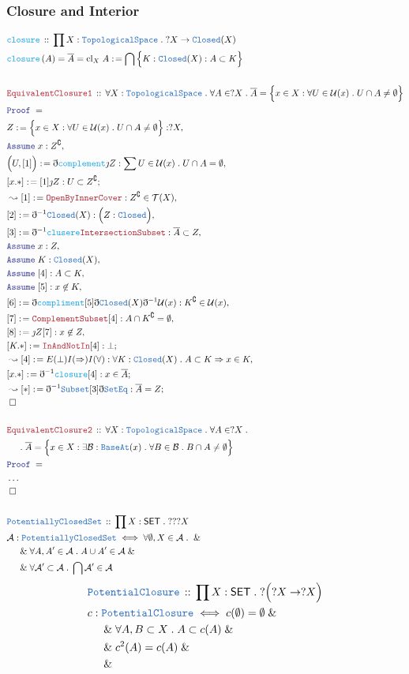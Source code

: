 \documentclass[12pt]{scrartcl}
\newcommand{\TYPE}[1]{\textcolor{NavyBlue}{\mathtt{#1}}}
\newcommand{\FUNC}[1]{\textcolor{Cerulean}{\mathtt{#1}}}
\newcommand{\LOGIC}[1]{\textcolor{Blue}{\mathtt{#1}}}
\newcommand{\THM}[1]{\textcolor{Maroon}{\mathtt{#1}}}
\renewcommand{\.}{\; . \;}
\newcommand{\de}{: \kern 0.1pc =}
\newcommand{\Act}[1]{\left( #1 \right)}
\newcommand{\Theorem}[2]{& \THM{#1} \, :: \, #2 \\ & \Proof = \\ }
\newcommand{\DeclareType}[2]{& \TYPE{#1} \, :: \, #2 \\}
\newcommand{\DefineType}[3]{& #1 : \TYPE{#2} \iff #3 \\}
\newcommand{\DeclareFunc}[2]{& \FUNC{#1} \, :: \, #2 \\}
\newcommand{\DefineNamedFunc}[4]{&  \FUNC{#1}\Act{#2} = #3 \de #4 \\}
\newcommand{\NewLine}{\\ & \kern 1pc}
\newcommand{\Page}[1]{ \begin{align*} #1 \end{align*}   }
\newcommand{ \bd }{ \ByDef }
\newcommand{\NoProof}{ & \ldots \\ \EndProof}
\renewcommand{\And}{\; \& \;}
\newcommand{\Imply}{\Rightarrow}
\renewcommand{\c}{\complement}
\newcommand{\Say}[3]{& #1 \de #2 : #3, \\}
\newcommand{\Conclude}[3]{& #1 \de #2 : #3; \\}
\newcommand{\Derive}[3]{& \leadsto #1 \de #2 : #3, \\}
\newcommand{\DeriveConclude}[3]{& \leadsto #1 \de #2 : #3 ; \\}
\newcommand{\Assume}[2]{& \LOGIC{Assume} \; #1 : #2, \\}
\newcommand{\QED}{\; \square}
\newcommand{\EndProof}{& \QED \\}
\newcommand{\ByDef}{\eth}
\newcommand{\ByConstr}{\jmath}
\newcommand{\Proof}{\LOGIC{Proof} \; }
\newcommand{\A}{\mathcal{A}}
\newcommand{\B}{\mathcal{B}}
\newcommand{\SET}{\mathsf{SET}}
\newcommand{\TS}{\TYPE{TopologicalSpace}}
\newcommand{\T}{\mathcal{T}}
\renewcommand{\U}{\mathcal{U}}
\begin{document}
\subsubsection{Closure and Interior}
\Page{
	\DeclareFunc{closure}
	{
		\prod X : \TS \. 
		?X \to \TYPE{Closed}(X) 
	}
	\DefineNamedFunc{closure}{A}{\overline{A} = \mathrm{cl}_X\;A}
	{ \bigcap \Big\{ K : \TYPE{Closed}(X) : A \subset K  \Big\}     }
	\\
	\Theorem{EquivalentClosure1}{
		\forall X : \TS \.
		\forall A \in ?X \.
		\overline{A} = 
		\Big\{x \in X : \forall U \in \U(x) \. U \cap A \neq \emptyset  \Big\}
	}
	\Say{Z}{\Big\{x \in X : \forall U \in \U(x) \. U \cap A \neq \emptyset\Big\}} 
	{?X}
	\Assume{x}{Z^\c}
	\Say{\Big(U,[1]\Big)}{\bd \FUNC{complement}\ByConstr Z}{
		\sum U \in \U(x) \. 
		U \cap A = \emptyset
	}
	\Conclude{[x.*]}{[1]\ByConstr Z}{ U \subset Z^\c}
	\Derive{[1]}{\THM{OpenByInnerCover}}{ Z^\c \in \T(X)  }
	\Say{[2]}{\bd^{-1} \TYPE{Closed}(X)}
	{
		\Big(
			Z : \TYPE{Closed}
		\Big)
	}
	\Say{[3]}{\bd^{-1} \FUNC{clusere} \THM{IntersectionSubset} }
	{
		\overline{A} \subset Z
	}
	\Assume{x}{Z}
	\Assume{K}{\TYPE{Closed}(X)}
	\Assume{[4]}{ A \subset K}
	\Assume{[5]}{x \not \in K}
	\Say{[6]}{\bd \FUNC{compliment}[5]\bd \TYPE{Closed}(X)\bd^{-1} \U(x) }
	{ K^\c \in \U(x)  }
	\Say{[7]}{\THM{ComplementSubset}[4]}{A \cap K^\c = \emptyset}
	\Say{[8]}{\ByConstr Z [7]}{x \not \in Z}
	\Conclude{[K.*]}{\THM{InAndNotIn}[4]}{\bot}
	\Derive{[4]}{E(\bot)I(\Imply)I(\forall)}
	{
		\forall K : \TYPE{Closed}(X) \. A \subset K \Imply x \in K
	}
	\Conclude{[x.*]}{\bd^{-1} \FUNC{closure}[4]}
	{
		x \in \overline{A}
	}
	\DeriveConclude{[*]}{\bd^{-1}\TYPE{Subset}[3]\bd \TYPE{SetEq}}
	{ \overline{A} = Z }
	\EndProof 
	\\
	\Theorem{EquivalentClosure2}{
		\forall X : \TS \.
		\forall A \in ?X \.
		\NewLine \.
		\overline{A} = 
		\Big\{x \in X : \exists \B : \TYPE{BaseAt}(x) \.  \forall B \in \B \.
		B \cap A \neq \emptyset  \Big\}
	}
	\NoProof
	\\
	\DeclareType{PotentiallyClosedSet}
	{
		\prod X : \SET \. ???X		
	}
	\DefineType{\A}{PotentiallyClosedSet}{
		\forall \emptyset, X \in \A \.  \And \NewLine \And
		\forall A,A' \in \A \. A \cup A' \in \A  \And \NewLine \And
		\forall \A' \subset \A \. \bigcap \A' \in \A
	}
}\Page{
	\DeclareType{PotentialClosure}
	{
		\prod X : \SET \. ?\Big(?X \to ?X\Big)
	}	
	\DefineType{c}{PotentialClosure}
	{
		c(\emptyset) = \emptyset \And \NewLine \And
		\forall A,B \subset X \. 
		A \subset c(A) 
		\And \NewLine \And 
		c^2(A) = c(A)
		\And \NewLine \And 
}}
\end{document}
